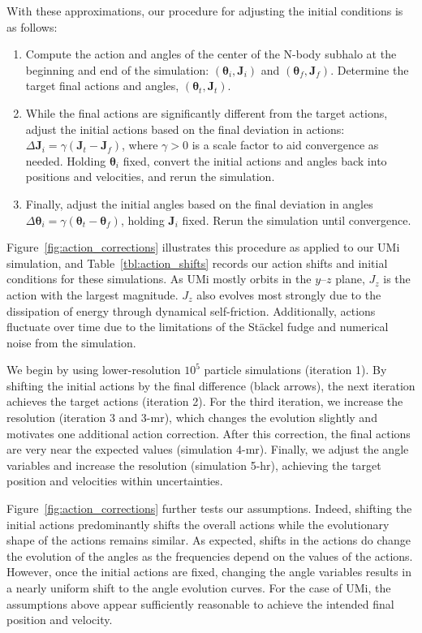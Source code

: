 \documentclass[linenumbers, twocolumn, twocolappendix]{aastex701}
\begin{document}
With these approximations, our procedure for adjusting the initial conditions is as follows:
\begin{enumerate}
    \item Compute the action and angles of the center of the N-body subhalo at the beginning and end of the simulation: $(\bm \theta_i, \mathbf J_i)$ and $(\bm \theta_f, \mathbf J_f)$. Determine the target final actions and angles, $(\bm \theta_t, \mathbf J_t)$. 
    \item While the final actions are significantly different from the target actions, adjust the initial actions based on the final deviation in actions: $\Delta \mathbf J_i = \gamma(\mathbf J_t - \mathbf J_f)$, where $\gamma > 0$ is a scale factor to aid convergence as needed. Holding $\bm \theta_i$ fixed, convert the initial actions and angles back into positions and velocities, and rerun the simulation.
    \item Finally, adjust the initial angles based on the final deviation in angles $\Delta \bm \theta_i = \gamma(\bm \theta_t - \bm \theta_f)$, holding $\mathbf J_i$ fixed. Rerun the simulation until convergence. 
\end{enumerate}




Figure~\ref{fig:action_corrections} illustrates this procedure as applied to our UMi simulation, and Table~\ref{tbl:action_shifts} records our action shifts and initial conditions for these simulations. As UMi mostly orbits in the $y$--$z$ plane, $J_z$ is the action with the largest magnitude. $J_z$ also evolves most strongly due to the dissipation of energy through dynamical self-friction. Additionally, actions fluctuate over time due to the limitations of the St\"ackel fudge and numerical noise from the simulation. 

We begin by using lower-resolution $10^5$ particle simulations (iteration 1). By shifting the initial actions by the final difference (black arrows), the next iteration achieves the target actions (iteration 2). For the third iteration, we increase the resolution (iteration 3 and 3-mr), which changes the evolution slightly and motivates one additional action correction.  
After this correction, the final actions are very near the expected values (simulation 4-mr). Finally, we adjust the angle variables and increase the resolution (simulation 5-hr), achieving the target position and velocities within uncertainties. 

Figure~\ref{fig:action_corrections} further tests our assumptions. Indeed, shifting the initial actions predominantly shifts the overall actions while the evolutionary shape of the actions remains similar.  As expected, shifts in the actions do change the evolution of the angles as the frequencies depend on the values of the actions. However, once the initial actions are fixed, changing the angle variables results in a nearly uniform shift to the angle evolution curves. For the case of UMi, the assumptions above appear sufficiently reasonable to achieve the intended final position and velocity.
\end{document}
